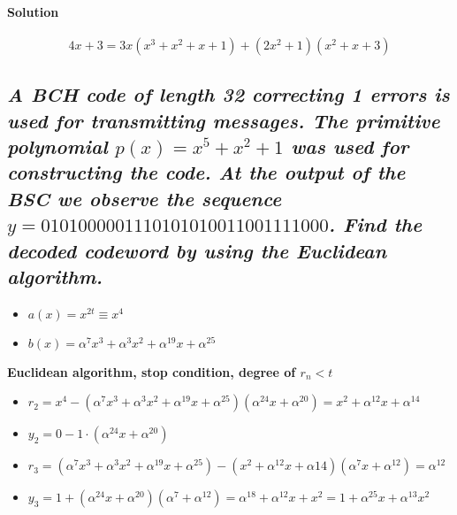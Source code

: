 \documentclass[11pt]{article}
\providecommand{\tightlist}{%
      \setlength{\itemsep}{0pt}\setlength{\parskip}{0pt}}
\begin{document}
\hypertarget{solution}{%
\paragraph{Solution}\label{solution}}

\[4x + 3 = 3x(x^3 + x^2 + x + 1) + (2x^2 + 1)(x^2 + x + 3)\]

    \hypertarget{a-bch-code-of-length-32-correcting-1-errors-is-used-for-transmitting-messages.-the-primitive-polynomial-px-x5-x2-1-was-used-for-constructing-the-code.-at-the-output-of-the-bsc-we-observe-the-sequence-y-0101000001110101010011001111000.-find-the-decoded-codeword-by-using-the-euclidean-algorithm.}{%
\subsection{\texorpdfstring{\emph{A BCH code of length 32 correcting 1
errors is used for transmitting messages. The primitive polynomial
\(p(x) = x^5 + x^2 + 1\) was used for constructing the code. At the
output of the BSC we observe the sequence
\(y = 0101000001110101010011001111000\). Find the decoded codeword by
using the Euclidean
algorithm.}}{A BCH code of length 32 correcting 1 errors is used for transmitting messages. The primitive polynomial p(x) = x\^{}5 + x\^{}2 + 1 was used for constructing the code. At the output of the BSC we observe the sequence y = 0101000001110101010011001111000. Find the decoded codeword by using the Euclidean algorithm.}}\label{a-bch-code-of-length-32-correcting-1-errors-is-used-for-transmitting-messages.-the-primitive-polynomial-px-x5-x2-1-was-used-for-constructing-the-code.-at-the-output-of-the-bsc-we-observe-the-sequence-y-0101000001110101010011001111000.-find-the-decoded-codeword-by-using-the-euclidean-algorithm.}}

\begin{itemize}
\tightlist
\item
  \(a(x) = x^{2t}≡x^4\)
\item
  \(b(x) = α^7x^3 + α^3x^2 + α^{19}x + α^{25}\)
\end{itemize}

\textbf{Euclidean algorithm, stop condition, degree of \(r_n < t\)}

\begin{itemize}
\item
  \(r_2 = x^4 - (α^7x^3 + α^3x^2 + α^{19}x + α^{25})(α^{24}x + α^{20}) = x^2 + α^{12}x + α^{14}\)
\item
  \(y_2 = 0 - 1⋅(α^{24}x + α^{20})\)
\item
  \(r_3 = (α^7x^3 + α^3x^2 + α^{19}x + α^{25}) - (x^2 + α^{12}x + \alpha{14})(α^{7}x + α^{12}) = α^{12}\)
\item
  \(y_3 = 1 + (α^{24}x + α^{20})(α^{7} + α^{12}) = α^{18} + α^{12}x + x^2 = 1 + α^{25}x + α^{13}x^2\)
\end{itemize}
\end{document}
